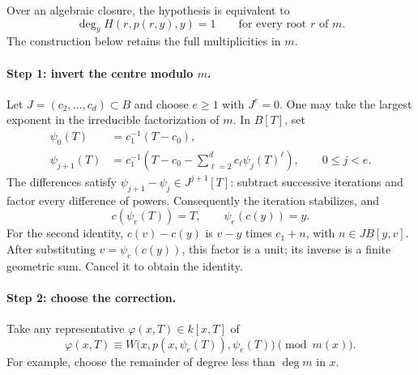 \documentclass[11pt,a4paper]{article}
\begin{document}
Over an algebraic closure, the hypothesis is equivalent to
\[
\deg_y H(r,p(r,y),y)=1\qquad\text{for every root }r\text{ of }m.
\]
The construction below retains the full multiplicities in $m$.

\paragraph{Step 1: invert the centre modulo $m$.}
Let $J=(c_2,\ldots,c_d)\subset B$ and choose $e\ge1$ with $J^e=0$.
One may take the largest exponent in the irreducible factorization of $m$.
In $B[T]$, set
\begin{equation}\label{eq:iteration}
\begin{aligned}
\psi_0(T)&=c_1^{-1}(T-c_0),\\
\psi_{j+1}(T)&=c_1^{-1}
\left(T-c_0-\sum_{\ell=2}^{d}c_\ell\psi_j(T)^\ell\right),
\qquad 0\le j<e.
\end{aligned}
\end{equation}
The differences satisfy $\psi_{j+1}-\psi_j\in J^{j+1}[T]$: subtract
successive iterations and factor every difference of powers. Consequently
the iteration stabilizes, and
\begin{equation}\label{eq:center-inverse}
c(\psi_e(T))=T,\qquad \psi_e(c(y))=y.
\end{equation}
For the second identity, $c(v)-c(y)$ is $v-y$ times $c_1+n$, with
$n\in J B[y,v]$. After substituting $v=\psi_e(c(y))$, this factor is a unit;
its inverse is a finite geometric sum. Cancel it to obtain the identity.

\paragraph{Step 2: choose the correction.}
Take any representative $\varphi(x,T)\in k[x,T]$ of
\begin{equation}\label{eq:correction}
\varphi(x,T)\equiv
W\bigl(x,p(x,\psi_e(T)),\psi_e(T)\bigr)\pmod{m(x)}.
\end{equation}
For example, choose the remainder of degree less than $\deg m$ in $x$.
\end{document}
